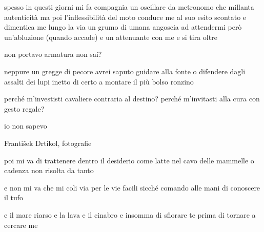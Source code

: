 \clearpage


\begin{poem}
	\begin{stanza}
		spesso in questi giorni mi fa compagnia\verseline
		un oscillare da metronomo\verseline
		che millanta autenticità\verseline
		ma poi l'inflessibilità del moto\verseline
		conduce me al suo esito scontato\verseline
		e dimentica me lungo la via\verseline
		un grumo di umana angoscia ad attendermi\verseline
		però un'abluzione (quando accade)\verseline
		e un attenuante con me\verseline
		e si tira oltre
	\end{stanza}
\end{poem}

\clearpage


\begin{poem}
	\begin{stanza}
		non portavo armatura\verseline
		non sai?
	\end{stanza}

	\begin{stanza}
		neppure un gregge di pecore\verseline
		avrei saputo guidare alla fonte\verseline
		o difendere dagli assalti dei lupi\verseline
		inetto di certo a montare\verseline
		il più bolso ronzino
	\end{stanza}

	\begin{stanza}
		perché m'investisti cavaliere\verseline
		contraria al destino?\verseline
		perché m'invitasti alla cura\verseline
		con gesto regale?
	\end{stanza}

	\begin{stanza}
		io non sapevo
	\end{stanza}
\end{poem}

\clearpage


\begin{artItem}
	František Drtikol, fotografie
\end{artItem}

\begin{poem}
	\begin{stanza}
		poi mi va di trattenere dentro\verseline
		il desiderio come latte\verseline
		nel cavo delle mammelle\verseline
		o cadenza non risolta da tanto
	\end{stanza}

	\begin{stanza}
		e non mi va che mi coli via\verseline
		per le vie facili\verseline
		sicché comando alle mani\verseline
		di conoscere il tufo
	\end{stanza}

	\begin{stanza}
		e il mare riarso e la lava\verseline
		e il cinabro e insomma\verseline
		di sfiorare te prima\verseline
		di tornare a cercare me
	\end{stanza}
\end{poem}

